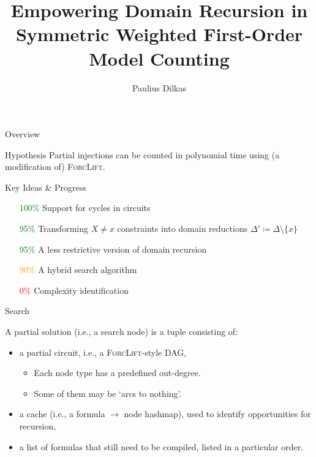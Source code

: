 \documentclass{beamer}
\author{Paulius Dilkas}
\title[Empowering Domain Recursion]{Empowering Domain Recursion in Symmetric Weighted First-Order Model Counting}
\date{}
\begin{document}

\maketitle

\begin{frame}{Overview}
  \begin{block}{Hypothesis}
    Partial injections can be counted in polynomial time using (a modification of) \textsc{ForcLift}.
  \end{block}
  \begin{block}{Key Ideas \& Progress}
    \begin{itemize}
    \item[\textcolor{green}{100\%}] Support for cycles in circuits
    \item[\textcolor{green}{95\%}] Transforming $X \ne x$ constraints into domain reductions $\Delta' \coloneqq \Delta \setminus \{ x \}$
    \item[\textcolor{green}{95\%}] A less restrictive version of domain recursion
    \item[\textcolor{orange}{90\%}] A hybrid search algorithm
    \item[\textcolor{red}{0\%}] Complexity identification
    \end{itemize}
  \end{block}
\end{frame}

\begin{frame}{Search}
  \begin{definition}
    A \alert{partial solution} (i.e., a search node) is a tuple consisting of:
    \begin{itemize}
    \item a partial circuit, i.e., a \textsc{ForcLift}-style DAG,
      \begin{itemize}
      \item Each node type has a predefined out-degree.
      \item Some of them may be `arcs to nothing'.
      \end{itemize}
    \item a cache (i.e., a formula $\to$ node hashmap), used to identify opportunities for recursion,
    \item a list of formulas that still need to be compiled, listed in a particular order.
    \end{itemize}
  \end{definition}
\end{frame}
\end{document}
